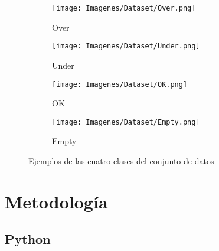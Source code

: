 \documentclass{report}
\begin{document}
\begin{figure}[H]
	 	\centering
	 	\begin{subfigure}[b]{0.45\linewidth}
	 	    \centering
	 		\texttt{[image: Imagenes/Dataset/Over.png]}
                    \caption{ Over } 
	 	    \label{fig:Dataset4Over}
	 	\end{subfigure}
	 	\centering
	 	\begin{subfigure}[b]{0.45\linewidth}
	 	    \centering
	 		\texttt{[image: Imagenes/Dataset/Under.png]}
                    \caption{ Under } 
	 	    \label{fig:Dataset4Under}
	 	\end{subfigure}
	 	\begin{subfigure}[b]{0.45\linewidth}
	 	    \centering
	 		\texttt{[image: Imagenes/Dataset/OK.png]}
                    \caption{ OK } 
	 	    \label{fig:Dataset4OK}
	 	\end{subfigure}
            \begin{subfigure}[b]{0.45\linewidth}
	 	    \centering
	 		\texttt{[image: Imagenes/Dataset/Empty.png]}
                    \caption{ Empty } 
	 	    \label{fig:Dataset4Empty}
	 	\end{subfigure}
	 	\caption{ Ejemplos de las cuatro clases del conjunto de datos \cite{AMDataset}} 
	 	\label{fig:Dataset4Imagenes}
\end{figure}








































\chapter{Metodología}


\section{Python}
\end{document}
